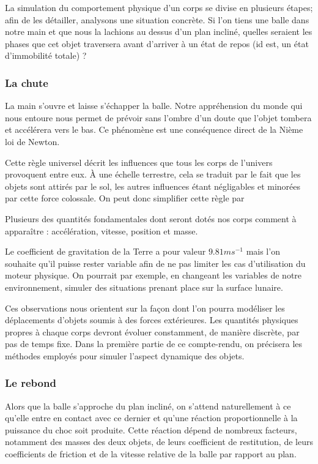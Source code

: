 La simulation du comportement physique d'un corps se divise en plusieurs étapes; afin de les détailler, analysons une situation concrète. Si l'on tiens une balle dans notre main et que nous la lachions au dessus d'un plan incliné, quelles seraient les phases que cet objet traversera avant d'arriver à un état de repos (id est, un état d'immobilité totale) ?

\subsubsection{La chute}

La main s'ouvre et laisse s'échapper la balle. Notre appréhension du monde qui nous entoure nous permet de prévoir sans l'ombre d'un doute que l'objet tombera et accélérera vers le bas. Ce phénomène est une conséquence direct de la Nième loi de Newton.

\cite{BLABLA je suis Newton}

Cette règle universel décrit les influences que tous les corps de l'univers provoquent entre eux. \`A une échelle terrestre, cela se traduit par le fait que les objets sont attirés par le sol, les autres influences étant négligables et minorées par cette force colossale. On peut donc simplifier cette règle par

Plusieurs des quantités fondamentales dont seront dotés nos corps comment à apparaître : accélération, vitesse, position et masse.

Le coefficient de gravitation de la Terre a pour valeur $9.81 ms^{-1}$ mais l'on souhaite qu'il puisse rester variable afin de ne pas limiter les cas d'utilisation du moteur physique. On pourrait par exemple, en changeant les variables de notre environnement, simuler des situations prenant place sur la surface lunaire.

Ces observations nous orientent sur la façon dont l'on pourra modéliser les déplacements d'objets soumis à des forces extérieures. Les quantités physiques propres à chaque corps devront évoluer constamment, de manière discrète, par pas de temps fixe. Dans la première partie de ce compte-rendu, on précisera les méthodes employés pour simuler l'aspect dynamique des objets.

\subsubsection{Le rebond}

Alors que la balle s'approche du plan incliné, on s'attend naturellement à ce qu'elle entre en contact avec ce dernier et qu'une réaction proportionnelle à la puissance du choc soit produite. Cette réaction dépend de nombreux facteurs, notamment des masses des deux objets, de leurs coefficient de restitution, de leurs coefficients de friction et de la vitesse relative de la balle par rapport au plan.


